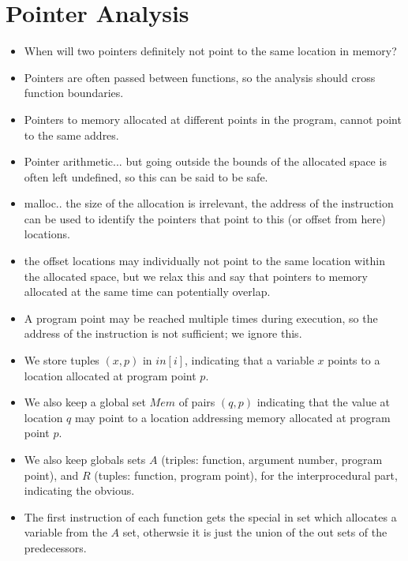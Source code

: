 \section{Pointer Analysis}

\begin{itemize}

\item When will two pointers definitely not point to the same location in
memory?

\item Pointers are often passed between functions, so the analysis should cross
function boundaries.

\item Pointers to memory allocated at different points in the program, cannot
point to the same addres.

\item Pointer arithmetic... but going outside the bounds of the allocated space
is often left undefined, so this can be said to be safe.

\item malloc.. the size of the allocation is irrelevant, the address of the
instruction can be used to identify the pointers that point to this (or offset
from here) locations.

\item the offset locations may individually not point to the same location
within the allocated space, but we relax this and say that pointers to memory
allocated at the same time can potentially overlap.

\item A program point may be reached multiple times during execution, so the
address of the instruction is not sufficient; we ignore this.

\item We store tuples $(x,p)$ in $in[i]$, indicating that a variable $x$ points
to a location allocated at program point $p$.

\item We also keep a global set $Mem$ of pairs $(q,p)$ indicating that the
value at location $q$ may point to a location addressing memory allocated at
program point $p$.

\item We also keep globals sets $A$ (triples: function, argument number,
program point), and $R$ (tuples: function, program point), for the
interprocedural part, indicating the obvious.

\item The first instruction of each function gets the special in set which
allocates a variable from the $A$ set, otherwsie it is just the union of the
out sets of the predecessors.


\end{itemize}
